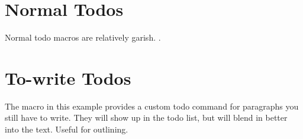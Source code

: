 \documentclass[
]{article}
\newcommand{\towrite}[1]{%
    \todo[inline,color=white,bordercolor=white]{\textcolor{gray}{Write: #1}}%
}
\begin{document}
\section{Normal Todos}

Normal todo macros are relatively garish.
.


\section{To-write Todos}

The macro in this example provides a custom todo command for paragraphs you still have to write.
They will show up in the todo list, but will blend in better into the text.
Useful for outlining.

\towrite{Possibly add more explanation}

\listoftodos
\end{document}
